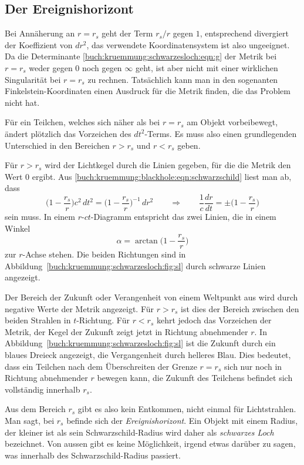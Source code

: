 %
%
\subsection{Der Ereignishorizont}
Bei Annäherung an $r=r_s$ geht der Term $r_s/r$ gegen $1$, entsprechend
divergiert der Koeffizient von $dr^2$,
das verwendete Koordinatensystem ist also ungeeignet.
Da die Determinante \eqref{buch:kruemmung:schwarzesloch:eqn:g}
der Metrik bei $r=r_s$ weder gegen $0$ noch
gegen $\infty$ geht, ist aber nicht mit einer wirklichen
Singularität bei $r=r_s$ zu rechnen.
Tatsächlich kann man in den sogenanten Finkelstein-Koordinaten
einen Ausdruck für die Metrik finden, die das Problem nicht hat.

Für ein Teilchen, welches sich näher als bei $r=r_s$ am Objekt
vorbeibewegt, ändert plötzlich das Vorzeichen des $dt^2$-Terms.
Es muss also einen grundlegenden Unterschied in den Bereichen
$r>r_s$ und $r<r_s$ geben.

Für $r>r_s$ wird der Lichtkegel durch die Linien gegeben, für
die die Metrik den Wert 0 ergibt.
%
Aus \eqref{buch:kruemmung:blackhole:eqn:schwarzschild} liest man
ab, dass 
\[
\biggl(1-\frac{r_s}{r}\biggr) c^2\, dt^2
=
\biggl(1-\frac{r_s}{r}\biggr)^{-1}\,dr^2
\qquad\Rightarrow\qquad
\frac1c\frac{dr}{dt}
=
\pm
\biggl(1-\frac{r_s}{r}\biggr)
\]
sein muss.
%
In einem $r$-$ct$-Diagramm entspricht das zwei Linien, die
in einem Winkel 
\[
\alpha = \arctan \biggl(1-\frac{r_s}{r}\biggr)
\]
zur $r$-Achse stehen.
Die beiden Richtungen sind in
Abbildung~\ref{buch:kruemmung:schwarzesloch:fig:sl}
durch schwarze Linien angezeigt.

Der Bereich der Zukunft oder Verangenheit von einem Weltpunkt aus
wird durch negative Werte der Metrik angezeigt.
Für $r>r_s$ ist dies der Bereich zwischen den beiden Strahlen in
$t$-Richtung.
Für $r<r_s$ kehrt jedoch das Vorzeichen der Metrik, der Kegel der
Zukunft zeigt jetzt in Richtung abnehmender $r$.
In Abbildung~\ref{buch:kruemmung:schwarzesloch:fig:sl} ist die
Zukunft durch ein blaues Dreieck angezeigt, die Vergangenheit durch
helleres Blau.
Dies bedeutet, dass ein Teilchen nach dem Überschreiten der Grenze $r=r_s$
sich nur noch in Richtung abnehmender $r$ bewegen kann, die Zukunft des
Teilchens befindet sich vollständig innerhalb $r_s$.

Aus dem Bereich $r_s$ gibt es also kein Entkommen, nicht einmal
für Lichtstrahlen.
Man sagt, bei $r_s$ befinde sich der \emph{Ereignishorizont}.
%
Ein Objekt mit einem Radius, der kleiner ist als sein Schwarzschild-Radius
wird daher als \emph{schwarzes Loch} bezeichnet.
%
Von aussen gibt es keine Möglichkeit, irgend etwas darüber zu sagen,
was innerhalb des Schwarzschild-Radius passiert.


